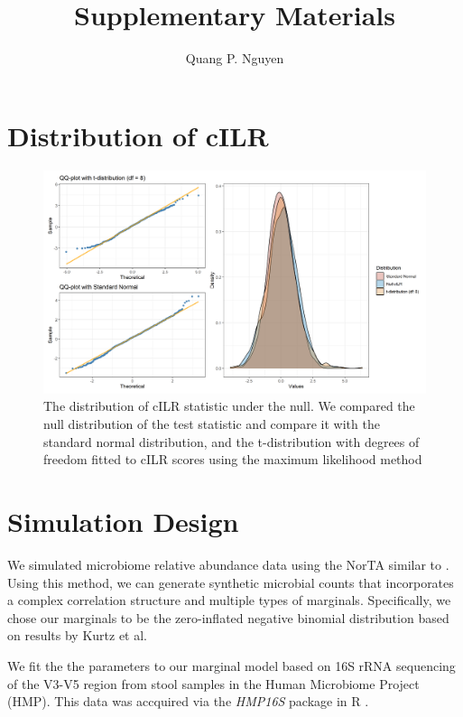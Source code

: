 \documentclass{article}
\author{Quang P. Nguyen}
\title{Supplementary Materials}
\begin{document}
\maketitle

\section{Distribution of cILR}
\begin{figure}[h]
    \centering
    \includegraphics[width=0.8\linewidth]{figures/null_distribution.png}
    \caption{The distribution of cILR statistic under the null. We compared the null distribution of the test statistic and compare it with the standard normal distribution, and the t-distribution with degrees of freedom fitted to cILR scores using the maximum likelihood method}
\end{figure}

\section{Simulation Design}
We simulated microbiome relative abundance data using the NorTA similar to \cite{cario}. Using this method, we can generate synthetic microbial counts that incorporates a complex correlation structure and multiple types of marginals. Specifically, we chose our marginals to be the zero-inflated negative binomial distribution based on results by Kurtz et al. \cite{kurtz2015}

\noindent We fit the the parameters to our marginal model based on 16S rRNA sequencing of the V3-V5 region from stool samples in the Human Microbiome Project (HMP). This data was accquired via the \emph{HMP16S} package in R \cite{schiffer2019}. 
\end{document}
